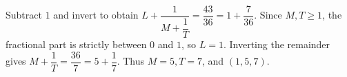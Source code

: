 Subtract $1$ and invert to obtain $L+\dfrac{1}{M+\dfrac{1}{T}}=\dfrac{43}{36}=1+\dfrac{7}{36}$. Since $M,T\ge1$, the fractional part is strictly between $0$ and $1$, so $L=1$. Inverting the remainder gives $M+\dfrac{1}{T}=\dfrac{36}{7}=5+\dfrac{1}{7}$. Thus $M=5,T=7$, and $\boxed{(1,5,7)}$.
